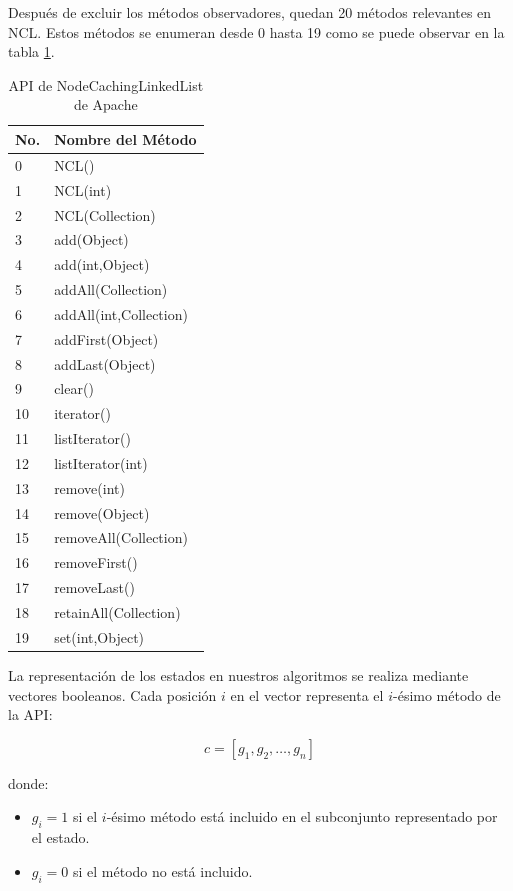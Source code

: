 Después de excluir los métodos observadores, quedan 20 métodos relevantes en NCL. Estos métodos se enumeran desde 0 hasta 19 como se puede observar en la tabla \ref{tab:ncl-api-infer}. 
\begin{table}[h!]
\centering
{\scriptsize
\begin{tabular}{|l|l|}
\hline
No. & Nombre del Método \\
\hline
0 & NCL() \\
1 & NCL(int) \\
2 & NCL(Collection) \\
3 & add(Object) \\
4 & add(int,Object) \\
5 & addAll(Collection) \\
6 & addAll(int,Collection) \\
7 & addFirst(Object) \\
8 & addLast(Object) \\
9 & clear() \\
10 & iterator() \\
11 & listIterator() \\
12 & listIterator(int) \\
13 & remove(int) \\
14 & remove(Object) \\
15 & removeAll(Collection) \\
16 & removeFirst() \\
17 & removeLast() \\
18 & retainAll(Collection) \\
19 & set(int,Object) \\
\hline
\end{tabular}
}
\caption{API de NodeCachingLinkedList de Apache}
\label{tab:ncl-api-infer}
\end{table}


La representación de los estados en nuestros algoritmos se realiza mediante vectores booleanos. Cada posición $i$ en el vector representa el $i$-ésimo método de la API:

\[
c = [g_1, g_2, \ldots, g_n]
\]

donde:
\begin{itemize}
    \item $g_i = 1$ si el $i$-ésimo método está incluido en el subconjunto representado por el estado.
    \item $g_i = 0$ si el método no está incluido.
\end{itemize}

